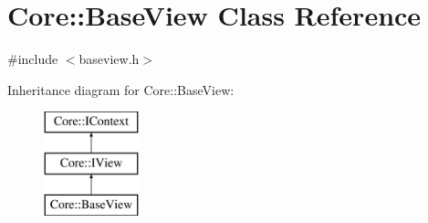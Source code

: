 \hypertarget{class_core_1_1_base_view}{\section{\-Core\-:\-:\-Base\-View \-Class \-Reference}
\label{class_core_1_1_base_view}
}


{\ttfamily \#include $<$baseview.\-h$>$}

\-Inheritance diagram for \-Core\-:\-:\-Base\-View\-:\begin{figure}[H]
\begin{center}
\leavevmode
\includegraphics[height=3.000000cm]{class_core_1_1_base_view}
\end{center}
\end{figure}
